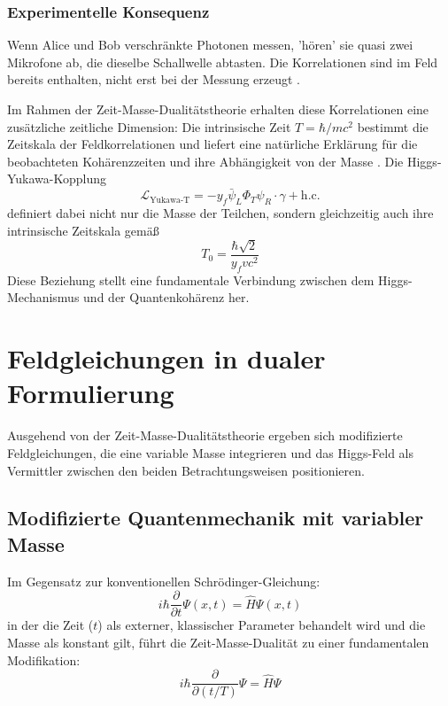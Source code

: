 \documentclass[a4paper,12pt]{article}
\begin{document}
	\subsubsection{Experimentelle Konsequenz}
	Wenn Alice und Bob verschränkte Photonen messen, 'hören' sie quasi zwei Mikrofone ab, die dieselbe Schallwelle abtasten. Die Korrelationen sind im Feld bereits enthalten, nicht erst bei der Messung erzeugt \cite{Zeilinger2010}.
	
	Im Rahmen der Zeit-Masse-Dualitätstheorie erhalten diese Korrelationen eine zusätzliche zeitliche Dimension: Die intrinsische Zeit $T = \hbar/mc^2$ bestimmt die Zeitskala der Feldkorrelationen und liefert eine natürliche Erklärung für die beobachteten Kohärenzzeiten und ihre Abhängigkeit von der Masse \cite{Pascher2024}. Die Higgs-Yukawa-Kopplung 
	\begin{equation}
		\mathcal{L}_{\text{Yukawa-T}} = -y_f \bar{\psi}_L \Phi_T \psi_R \cdot \gamma + \text{h.c.}
	\end{equation}
	definiert dabei nicht nur die Masse der Teilchen, sondern gleichzeitig auch ihre intrinsische Zeitskala gemäß 
	\begin{equation}
		T_0 = \frac{\hbar \sqrt{2}}{y_f v c^2}
	\end{equation}
	Diese Beziehung stellt eine fundamentale Verbindung zwischen dem Higgs-Mechanismus und der Quantenkohärenz her.
	
	\section{Feldgleichungen in dualer Formulierung}
	
	Ausgehend von der Zeit-Masse-Dualitätstheorie ergeben sich modifizierte Feldgleichungen, die eine variable Masse integrieren und das Higgs-Feld als Vermittler zwischen den beiden Betrachtungsweisen positionieren.
	
	\subsection{Modifizierte Quantenmechanik mit variabler Masse}
	
	Im Gegensatz zur konventionellen Schrödinger-Gleichung:
	\begin{equation}
		i\hbar \frac{\partial}{\partial t}\Psi(x,t) = \hat{H}\Psi(x,t)
	\end{equation}
	in der die Zeit ($t$) als externer, klassischer Parameter behandelt wird und die Masse als konstant gilt, führt die Zeit-Masse-Dualität zu einer fundamentalen Modifikation:
	\begin{equation}
		i\hbar \frac{\partial}{\partial (t/T)}\Psi = \hat{H}\Psi
	\end{equation}
	
\end{document}
